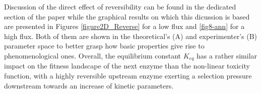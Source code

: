 
Discussion of the direct effect of reversibility can be found in the dedicated section of the paper while 
the graphical results on which this dicussion is based are presented in Figures \ref{figure2D_Reverse} for a low flux and \ref{fig8-ann} for a high flux. Both of them are shown in the theoretical's (A) and experimenter's (B) parameter space to better grasp how basic properties give rise to phenomenological ones. Overall, the equilibrium constant $K_{eq}$ has a rather similar impact on the fitness landscape of the next enzyme than the non-linear toxicity function, with a highly reversible upstream enzyme exerting a selection pressure downstream towards an increase of kinetic parameters.


